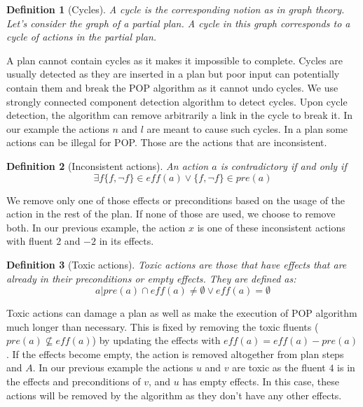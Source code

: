 \documentclass[]{article}
\newtheorem{definition}{Definition}
\begin{document}
\begin{definition}[Cycles]

A cycle is the corresponding notion as in graph theory. Let's consider
the graph of a partial plan. A cycle in this graph corresponds to a
cycle of actions in the partial plan.

\end{definition}

A plan cannot contain cycles as it makes it impossible to complete.
Cycles are usually detected as they are inserted in a plan but poor
input can potentially contain them and break the POP algorithm as it
cannot undo cycles. We use strongly connected component detection
algorithm to detect cycles. Upon cycle detection, the algorithm can
remove arbitrarily a link in the cycle to break it. In our example the
actions \(n\) and \(l\) are meant to cause such cycles. In a plan some
actions can be illegal for POP. Those are the actions that are
inconsistent.

\begin{definition}[Inconsistent actions]

An action \(a\) is contradictory if and only if
\[\exists f \{f, \lnot f \} \in eff(a) \lor \{f, \lnot f \} \in pre(a)\]

\end{definition}

We remove only one of those effects or preconditions based on the usage
of the action in the rest of the plan. If none of those are used, we
choose to remove both. In our previous example, the action \(x\) is one
of these inconsistent actions with fluent \(2\) and \(-2\) in its
effects.

\begin{definition}[Toxic actions]

Toxic actions are those that have effects that are already in their
preconditions or empty effects. They are defined as:
\[a | pre(a) \cap eff(a) \neq \emptyset \lor eff(a) = \emptyset\]

\end{definition}

Toxic actions can damage a plan as well as make the execution of POP
algorithm much longer than necessary. This is fixed by removing the
toxic fluents (\(pre(a) \nsubseteq eff(a)\)) by updating the effects
with \(eff(a) = eff(a)-pre(a)\). If the effects become empty, the action
is removed altogether from plan steps and \(A\). In our previous example
the actions \(u\) and \(v\) are toxic as the fluent \(4\) is in the
effects and preconditions of \(v\), and \(u\) has empty effects. In this
case, these actions will be removed by the algorithm as they don't have
any other effects.
\end{document}
